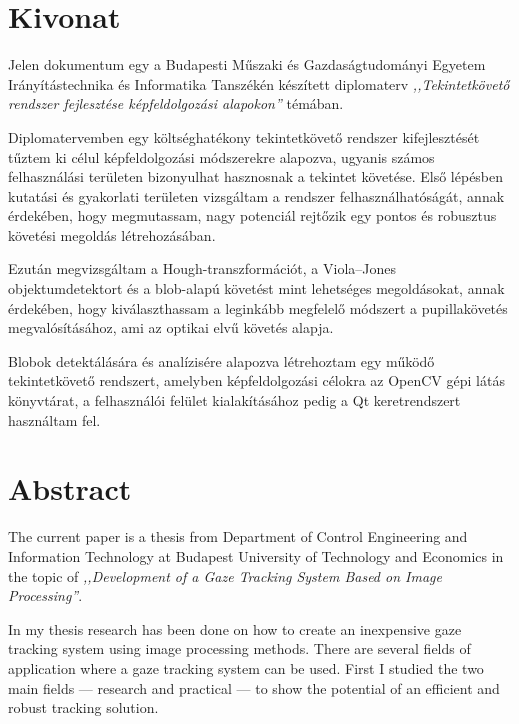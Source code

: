 \chapter*{Kivonat}

Jelen dokumentum egy a Budapesti Műszaki és Gazdaságtudományi Egyetem Irányítástechnika és Informatika Tanszékén készített diplomaterv \emph{,,Tekintetkövető rendszer fejlesztése képfeldolgozási alapokon''} témában. 

\bigskip

Diplomatervemben egy költséghatékony tekintetkövető rendszer kifejlesztését tűztem ki célul képfeldolgozási módszerekre alapozva, ugyanis számos felhasználási területen bizonyulhat hasznosnak a tekintet követése. Első lépésben kutatási és gyakorlati területen vizsgáltam a rendszer felhasználhatóságát, annak érdekében, hogy megmutassam, nagy potenciál rejtőzik egy pontos és robusztus követési megoldás létrehozásában.

Ezután megvizsgáltam a Hough-transzformációt, a Viola--Jones objektumdetektort és a blob-alapú követést mint lehetséges megoldásokat, annak érdekében, hogy kiválaszthassam a leginkább megfelelő módszert a pupillakövetés megvalósításához, ami az optikai elvű követés alapja.

Blobok detektálására és analízisére alapozva létrehoztam egy működő tekintetkövető rendszert, amelyben képfeldolgozási célokra az OpenCV gépi látás könyvtárat, a felhasználói felület kialakításához pedig a Qt keretrendszert használtam fel.


\newpage

\chapter*{Abstract}

The current paper is a thesis from Department of Control Engineering and Information Technology at Budapest University of Technology and Economics in the topic of \emph{,,Development of a Gaze Tracking System Based on Image Processing''}. 

\bigskip

In my thesis research has been done on how to create an inexpensive gaze tracking system using image processing methods. There are several fields of application where a gaze tracking system can be used. First I studied the two main fields --- research and practical --- to show the potential of an efficient and robust tracking solution.

